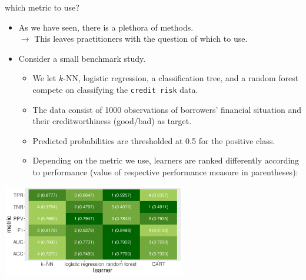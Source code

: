 \documentclass[11pt,compress,t,notes=noshow, xcolor=table]{beamer}
\begin{document}

\begin{vbframe}{which metric to use?}

\begin{itemize}
  \footnotesize
  \item As we have seen, there is a plethora of methods. \\
  $\rightarrow$ This leaves practitioners with the question of which to use.
  \item Consider a small benchmark study.
  \begin{itemize}
    \footnotesize
    \item We let $k$-NN, logistic regression, a classification tree, and a random 
    forest compete on classifying the \texttt{credit risk} data.
    \item The data consist of 1000 observations of borrowers' financial 
    situation and their creditworthiness (good/bad) as target.
    \item Predicted probabilities are thresholded at 0.5 for the positive class.
    \item Depending on the metric we use, learners are ranked differently 
    according to performance (value of respective performance measure in 
    parentheses):
  \end{itemize}
\end{itemize}

\begin{center}
\includegraphics[width=0.6\textwidth]{figure/eval_mclass_benchmark.pdf}
\end{center}

\framebreak


\end{vbframe}
\end{document}
